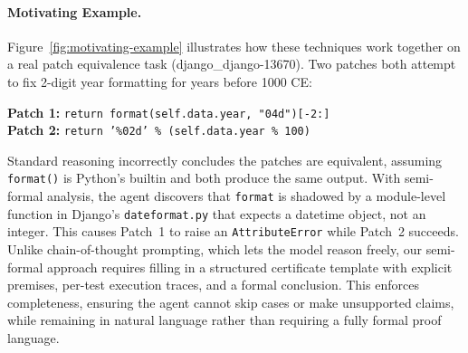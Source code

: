 \documentclass[]{meta}
\begin{document}
\paragraph{Motivating Example.}
Figure~\ref{fig:motivating-example} illustrates how these techniques work together on a real patch equivalence task (django\_django-13670). Two patches both attempt to fix 2-digit year formatting for years before 1000 CE:
\begin{center}
\begin{minipage}{0.85\linewidth}
\begin{tcolorbox}[colback=gray!5, colframe=gray!50, boxrule=0.3pt, arc=1pt, left=2pt, right=2pt, top=2pt, bottom=2pt]
\small
\textbf{Patch 1:} \texttt{return format(self.data.year, "04d")[-2:]}\\
\textbf{Patch 2:} \texttt{return '\%02d' \% (self.data.year \% 100)}
\end{tcolorbox}
\end{minipage}
\end{center}
Standard reasoning incorrectly concludes the patches are equivalent, assuming \texttt{format()} is Python's builtin and both produce the same output. With semi-formal analysis, the agent discovers that \texttt{format} is shadowed by a module-level function in Django's \texttt{dateformat.py} that expects a datetime object, not an integer. This causes Patch~1 to raise an \texttt{AttributeError} while Patch~2 succeeds.
Unlike chain-of-thought prompting, which lets the model reason freely, our semi-formal approach requires filling in a structured certificate template with explicit premises, per-test execution traces, and a formal conclusion.
This enforces completeness, ensuring the agent cannot skip cases or make unsupported claims, while remaining in natural language rather than requiring a fully formal proof language.
\end{document}

